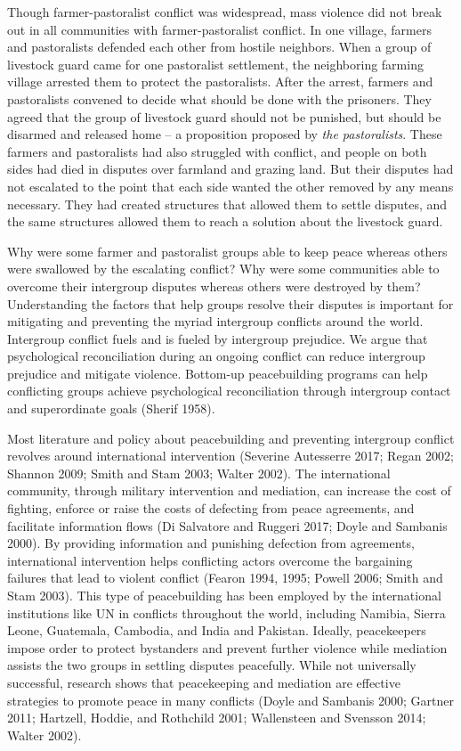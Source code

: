 \documentclass[11pt]{article}
\begin{document}
Though farmer-pastoralist conflict was widespread, mass violence did not
break out in all communities with farmer-pastoralist conflict. In one
village, farmers and pastoralists defended each other from hostile
neighbors. When a group of livestock guard came for one pastoralist
settlement, the neighboring farming village arrested them to protect the
pastoralists. After the arrest, farmers and pastoralists convened to
decide what should be done with the prisoners. They agreed that the
group of livestock guard should not be punished, but should be disarmed
and released home -- a proposition proposed by \emph{the pastoralists}.
These farmers and pastoralists had also struggled with conflict, and
people on both sides had died in disputes over farmland and grazing
land. But their disputes had not escalated to the point that each side
wanted the other removed by any means necessary. They had created
structures that allowed them to settle disputes, and the same structures
allowed them to reach a solution about the livestock guard.

Why were some farmer and pastoralist groups able to keep peace whereas
others were swallowed by the escalating conflict? Why were some
communities able to overcome their intergroup disputes whereas others
were destroyed by them? Understanding the factors that help groups
resolve their disputes is important for mitigating and preventing the
myriad intergroup conflicts around the world. Intergroup conflict fuels
and is fueled by intergroup prejudice. We argue that psychological
reconciliation during an ongoing conflict can reduce intergroup
prejudice and mitigate violence. Bottom-up peacebuilding programs can
help conflicting groups achieve psychological reconciliation through
intergroup contact and superordinate goals (Sherif 1958).

Most literature and policy about peacebuilding and preventing intergroup
conflict revolves around international intervention (Severine Autesserre
2017; Regan 2002; Shannon 2009; Smith and Stam 2003; Walter 2002). The
international community, through military intervention and mediation,
can increase the cost of fighting, enforce or raise the costs of
defecting from peace agreements, and facilitate information flows (Di
Salvatore and Ruggeri 2017; Doyle and Sambanis 2000). By providing
information and punishing defection from agreements, international
intervention helps conflicting actors overcome the bargaining failures
that lead to violent conflict (Fearon 1994, 1995; Powell 2006; Smith and
Stam 2003). This type of peacebuilding has been employed by the
international institutions like UN in conflicts throughout the world,
including Namibia, Sierra Leone, Guatemala, Cambodia, and India and
Pakistan. Ideally, peacekeepers impose order to protect bystanders and
prevent further violence while mediation assists the two groups in
settling disputes peacefully. While not universally successful, research
shows that peacekeeping and mediation are effective strategies to
promote peace in many conflicts (Doyle and Sambanis 2000; Gartner 2011;
Hartzell, Hoddie, and Rothchild 2001; Wallensteen and Svensson 2014;
Walter 2002).
\end{document}
